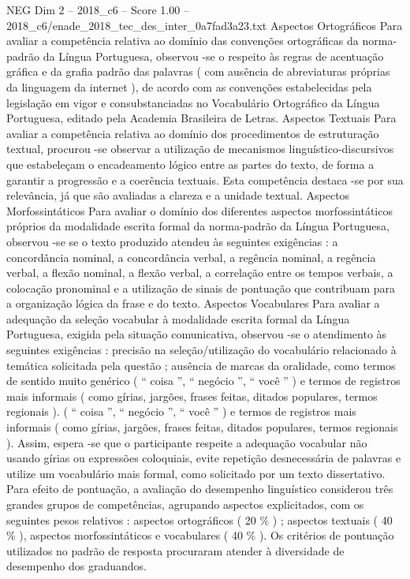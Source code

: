 \begin{textsample}{NEG Dim 2 – 2018\_c6 – Score 1.00 – 2018\_c6/enade\_2018\_tec\_des\_inter\_0a7fad3a23.txt}
Aspectos Ortográficos Para avaliar a competência relativa ao domínio das convenções ortográficas da norma-padrão da Língua Portuguesa, observou -se o respeito às regras de acentuação gráfica e da grafia padrão das palavras ( com ausência de abreviaturas próprias da linguagem da internet ), de acordo com as convenções estabelecidas pela legislação em vigor e consubstanciadas no Vocabulário Ortográfico da Língua Portuguesa, editado pela Academia Brasileira de Letras.
Aspectos Textuais Para avaliar a competência relativa ao domínio dos procedimentos de estruturação textual, procurou -se observar a utilização de mecanismos linguístico-discursivos que estabeleçam o encadeamento lógico entre as partes do texto, de forma a garantir a progressão e a coerência textuais.
Esta competência destaca -se por sua relevância, já que são avaliadas a clareza e a unidade textual.
Aspectos Morfossintáticos Para avaliar o domínio dos diferentes aspectos morfossintáticos próprios da modalidade escrita formal da norma-padrão da Língua Portuguesa, observou -se se o texto produzido atendeu às seguintes exigências : a concordância nominal, a concordância verbal, a regência nominal, a regência verbal, a flexão nominal, a flexão verbal, a correlação entre os tempos verbais, a colocação pronominal e a utilização de sinais de pontuação que contribuam para a organização lógica da frase e do texto.
Aspectos Vocabulares Para avaliar a adequação da seleção vocabular à modalidade escrita formal da Língua Portuguesa, exigida pela situação comunicativa, observou -se o atendimento às seguintes exigências : precisão na seleção/utilização do vocabulário relacionado à temática solicitada pela questão ; ausência de marcas da oralidade, como termos de sentido muito genérico ( “ coisa ”, “ negócio ”, “ você ” ) e termos de registros mais informais ( como gírias, jargões, frases feitas, ditados populares, termos regionais ). ( “ coisa ”, “ negócio ”, “ você ” ) e termos de registros mais informais ( como gírias, jargões, frases feitas, ditados populares, termos regionais ).
Assim, espera -se que o participante respeite a adequação vocabular não usando gírias ou expressões coloquiais, evite repetição desnecessária de palavras e utilize um vocabulário mais formal, como solicitado por um texto dissertativo.
Para efeito de pontuação, a avaliação do desempenho linguístico considerou três grandes grupos de competências, agrupando aspectos explicitados, com os seguintes pesos relativos : aspectos ortográficos ( 20 \% ) ; aspectos textuais ( 40 \% ), aspectos morfossintáticos e vocabulares ( 40 \% ).
Os critérios de pontuação utilizados no padrão de resposta procuraram atender à diversidade de desempenho dos graduandos.

\end{textsample}
